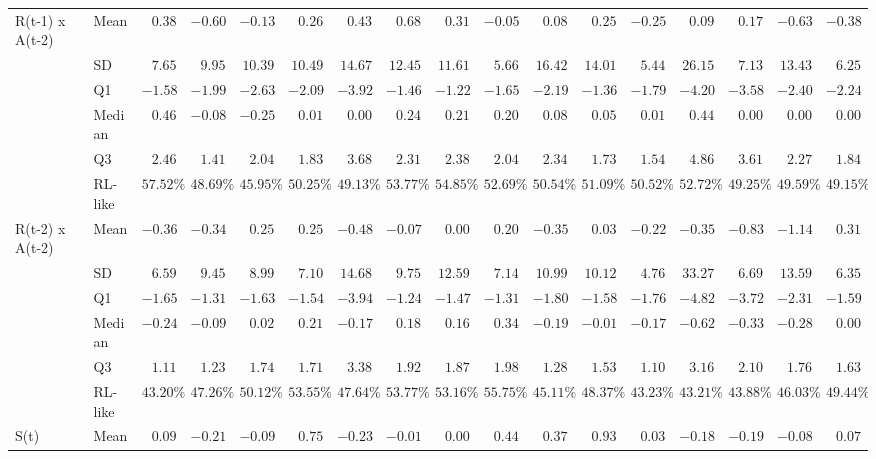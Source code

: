 \documentclass[
  number,
  preprint,
  3p,
  onecolumn]{elsarticle}
\begin{document}
{\begin{longtable}{l|l|rrrrrrrrrrrrrrr}
\midrule\addlinespace[2.5pt]
R(t-1) x 
 A(t-2) & Mean & $0.38$ & $-0.60$ & $-0.13$ & $0.26$ & $0.43$ & $0.68$ & $0.31$ & $-0.05$ & $0.08$ & $0.25$ & $-0.25$ & $0.09$ & $0.17$ & $-0.63$ & $-0.38$ \\ 
 & SD & $7.65$ & $9.95$ & $10.39$ & $10.49$ & $14.67$ & $12.45$ & $11.61$ & $5.66$ & $16.42$ & $14.01$ & $5.44$ & $26.15$ & $7.13$ & $13.43$ & $6.25$ \\ 
 & Q1 & $-1.58$ & $-1.99$ & $-2.63$ & $-2.09$ & $-3.92$ & $-1.46$ & $-1.22$ & $-1.65$ & $-2.19$ & $-1.36$ & $-1.79$ & $-4.20$ & $-3.58$ & $-2.40$ & $-2.24$ \\ 
 & Median & $0.46$ & $-0.08$ & $-0.25$ & $0.01$ & $0.00$ & $0.24$ & $0.21$ & $0.20$ & $0.08$ & $0.05$ & $0.01$ & $0.44$ & $0.00$ & $0.00$ & $0.00$ \\ 
 & Q3 & $2.46$ & $1.41$ & $2.04$ & $1.83$ & $3.68$ & $2.31$ & $2.38$ & $2.04$ & $2.34$ & $1.73$ & $1.54$ & $4.86$ & $3.61$ & $2.27$ & $1.84$ \\ 
 & RL-like & $57.52\%$ & $48.69\%$ & $45.95\%$ & $50.25\%$ & $49.13\%$ & $53.77\%$ & $54.85\%$ & $52.69\%$ & $50.54\%$ & $51.09\%$ & $50.52\%$ & $52.72\%$ & $49.25\%$ & $49.59\%$ & $49.15\%$ \\ 
\midrule\addlinespace[2.5pt]
R(t-2) x 
 A(t-2) & Mean & $-0.36$ & $-0.34$ & $0.25$ & $0.25$ & $-0.48$ & $-0.07$ & $0.00$ & $0.20$ & $-0.35$ & $0.03$ & $-0.22$ & $-0.35$ & $-0.83$ & $-1.14$ & $0.31$ \\ 
 & SD & $6.59$ & $9.45$ & $8.99$ & $7.10$ & $14.68$ & $9.75$ & $12.59$ & $7.14$ & $10.99$ & $10.12$ & $4.76$ & $33.27$ & $6.69$ & $13.59$ & $6.35$ \\ 
 & Q1 & $-1.65$ & $-1.31$ & $-1.63$ & $-1.54$ & $-3.94$ & $-1.24$ & $-1.47$ & $-1.31$ & $-1.80$ & $-1.58$ & $-1.76$ & $-4.82$ & $-3.72$ & $-2.31$ & $-1.59$ \\ 
 & Median & $-0.24$ & $-0.09$ & $0.02$ & $0.21$ & $-0.17$ & $0.18$ & $0.16$ & $0.34$ & $-0.19$ & $-0.01$ & $-0.17$ & $-0.62$ & $-0.33$ & $-0.28$ & $0.00$ \\ 
 & Q3 & $1.11$ & $1.23$ & $1.74$ & $1.71$ & $3.38$ & $1.92$ & $1.87$ & $1.98$ & $1.28$ & $1.53$ & $1.10$ & $3.16$ & $2.10$ & $1.76$ & $1.63$ \\ 
 & RL-like & $43.20\%$ & $47.26\%$ & $50.12\%$ & $53.55\%$ & $47.64\%$ & $53.77\%$ & $53.16\%$ & $55.75\%$ & $45.11\%$ & $48.37\%$ & $43.23\%$ & $43.21\%$ & $43.88\%$ & $46.03\%$ & $49.44\%$ \\ 
\midrule\addlinespace[2.5pt]
S(t) & Mean & $0.09$ & $-0.21$ & $-0.09$ & $0.75$ & $-0.23$ & $-0.01$ & $0.00$ & $0.44$ & $0.37$ & $0.93$ & $0.03$ & $-0.18$ & $-0.19$ & $-0.08$ & $0.07$ \\ 

\end{longtable}}
\end{document}

